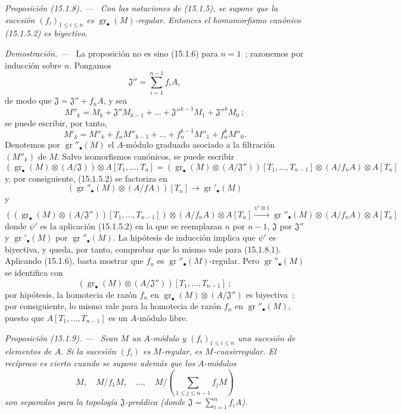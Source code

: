 \documentclass[10pt,oneside]{book}
\makeatletter
\newcommand{\gr}{\operatorname{gr}}
\newcommand{\setmanualcurrentlabel}[1]{\def\@currentlabel{#1}}
\newenvironment{proposition}[1][]{%
  \setmanualcurrentlabel{#1}\par\medskip\noindent\itshape Proposición (#1). ---\ }{\par}
\newenvironment{proof}{%
  \par\medskip\noindent\textit{Demostración. ---\ }}{\par}
\makeatother
\begin{document}
\begin{proposition}[15.1.8]
\label{0.15.1.8-es}
Con las notaciones de (15.1.5), se supone que la sucesión
$(f_i)_{1\leq i\leq n}$ es $\gr_\bullet(M)$-regular. Entonces
el homomorfismo canónico (15.1.5.2) es biyectivo.
\end{proposition}

\begin{proof}
La proposición no es sino (15.1.6) para $n=1$~; razonemos por inducción sobre
$n$. Pongamos
\[
  \mathfrak{J}''=\sum_{i=1}^{n-1}f_iA,
\]
de modo que $\mathfrak{J}=\mathfrak{J}''+f_nA$, y sea
\[
  M''_k=M_k+\mathfrak{J}''M_{k-1}+\ldots+
  \mathfrak{J}''^{k-1}M_1+\mathfrak{J}''^kM_0~;
\]
se puede escribir, por tanto,
\[
  M'_k=M''_k+f_nM''_{k-1}+\ldots+f_n^{k-1}M''_1+f_n^kM''_0.
\]
Denotemos por $\gr''_\bullet(M)$ el $A$-módulo graduado asociado a la filtración
$(M''_k)$ de $M$. Salvo isomorfismos canónicos, se puede escribir
\[
  (\gr_\bullet(M)\otimes(A/\mathfrak{J}))\otimes A[T_1,\ldots,T_n]
  =
  (\gr_\bullet(M)\otimes(A/\mathfrak{J}''))[T_1,\ldots,T_{n-1}]
  \otimes(A/f_nA)\otimes A[T_n]
\]
y, por consiguiente, (15.1.5.2) se factoriza en
\[
  (\gr''_\bullet(M)\otimes(A/fA))[T_n]\longrightarrow\gr'_\bullet(M)
  \tag{15.1.8.1}\label{0.15.1.8.1-es}
\]
y
\[
  ((\gr_\bullet(M)\otimes(A/\mathfrak{J}''))[T_1,\ldots,T_{n-1}])
  \otimes(A/f_nA)\otimes A[T_n]
  \xrightarrow{\psi'\otimes1}
  \gr''_\bullet(M)\otimes(A/f_nA)\otimes A[T_n]
\]
donde $\psi'$ es la aplicación (15.1.5.2) en la que se reemplazan $n$ por
$n-1$, $\mathfrak{J}$ por $\mathfrak{J}''$ y $\gr'_\bullet(M)$ por
$\gr''_\bullet(M)$. La hipótesis de inducción implica que $\psi'$ es
biyectiva, y queda, por tanto, comprobar que lo mismo vale para (15.1.8.1).
Aplicando (15.1.6), basta mostrar que $f_n$ es
$\gr''_\bullet(M)$-regular. Pero $\gr''_\bullet(M)$ se identifica con
\[
  (\gr_\bullet(M)\otimes(A/\mathfrak{J}''))
  [T_1,\ldots,T_{n-1}]~;
\]
por hipótesis, la homotecia de razón $f_n$ en
$\gr_\bullet(M)\otimes(A/\mathfrak{J}'')$ es biyectiva~; por consiguiente, lo
mismo vale para la homotecia de razón $f_n$ en $\gr''_\bullet(M)$, puesto que
$A[T_1,\ldots,T_{n-1}]$ es un $A$-módulo libre.
\end{proof}
\begin{proposition}[15.1.9]
\label{0.15.1.9-es}
Sean $M$ un $A$-módulo y $(f_i)_{1\leq i\leq n}$ una sucesión de elementos de
$A$. Si la sucesión $(f_i)$ es $M$-regular, es $M$-cuasirregular. El recíproco
es cierto cuando se supone además que los $A$-módulos
\[
  M,\quad M/f_1M,\quad\ldots,\quad
  M/\left(\sum_{1\leq j\leq n-1}f_jM\right)
\]
son separados para la topología $\mathfrak{J}$-preádica (donde
$\mathfrak{J}=\sum_{i=1}^n f_iA$).
\end{proposition}
\end{document}
